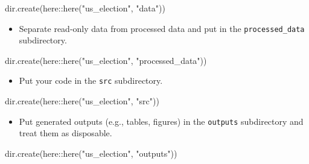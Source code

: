 \documentclass[
  letterpaper,
  DIV=11,
  numbers=noendperiod]{scrreprt}
\newenvironment{Shaded}{\begin{snugshade}}{\end{snugshade}}
\newcommand{\FunctionTok}[1]{\textcolor[rgb]{0.28,0.35,0.67}{#1}}
\newcommand{\NormalTok}[1]{\textcolor[rgb]{0.00,0.23,0.31}{#1}}
\newcommand{\SpecialCharTok}[1]{\textcolor[rgb]{0.37,0.37,0.37}{#1}}
\newcommand{\StringTok}[1]{\textcolor[rgb]{0.13,0.47,0.30}{#1}}
\providecommand{\tightlist}{%
  \setlength{\itemsep}{0pt}\setlength{\parskip}{0pt}}\usepackage{longtable,booktabs,array}
\begin{document}
\begin{Shaded}
\begin{Highlighting}[]
\FunctionTok{dir.create}\NormalTok{(here}\SpecialCharTok{::}\FunctionTok{here}\NormalTok{(}\StringTok{"us\_election"}\NormalTok{, }\StringTok{"data"}\NormalTok{))}
\end{Highlighting}
\end{Shaded}

\begin{itemize}
\tightlist
\item
  Separate read-only data from processed data and put in the
  \texttt{processed\_data} subdirectory.
\end{itemize}

\begin{Shaded}
\begin{Highlighting}[]
\FunctionTok{dir.create}\NormalTok{(here}\SpecialCharTok{::}\FunctionTok{here}\NormalTok{(}\StringTok{"us\_election"}\NormalTok{, }\StringTok{"processed\_data"}\NormalTok{))}
\end{Highlighting}
\end{Shaded}

\begin{itemize}
\tightlist
\item
  Put your code in the \texttt{src} subdirectory.
\end{itemize}

\begin{Shaded}
\begin{Highlighting}[]
\FunctionTok{dir.create}\NormalTok{(here}\SpecialCharTok{::}\FunctionTok{here}\NormalTok{(}\StringTok{"us\_election"}\NormalTok{, }\StringTok{"src"}\NormalTok{))}
\end{Highlighting}
\end{Shaded}

\begin{itemize}
\tightlist
\item
  Put generated outputs (e.g., tables, figures) in the \texttt{outputs}
  subdirectory and treat them as disposable.
\end{itemize}

\begin{Shaded}
\begin{Highlighting}[]
\FunctionTok{dir.create}\NormalTok{(here}\SpecialCharTok{::}\FunctionTok{here}\NormalTok{(}\StringTok{"us\_election"}\NormalTok{, }\StringTok{"outputs"}\NormalTok{))}
\end{Highlighting}
\end{Shaded}
\end{document}
